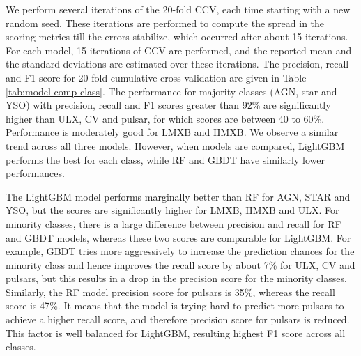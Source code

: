 \documentclass[fleqn,usenatbib]{mnras}
\begin{document}
    We perform several iterations of the 20-fold CCV, each time starting with a new random seed. These iterations are performed to compute the spread in the scoring metrics till the errors stabilize, which occurred after about 15 iterations. For each model, 15 iterations of CCV are performed, and the reported  mean and the standard deviations are estimated over these iterations.
    The precision, recall and F1 score for 20-fold cumulative cross validation are given in Table \ref{tab:model-comp-class}. The performance for majority classes (AGN, star and YSO) with precision, recall and F1 scores greater than 92\% are significantly higher than ULX, CV and pulsar, for which scores are between 40 to 60\%. Performance is moderately good for LMXB and HMXB. We observe a similar trend across all three models. However, when models are compared, LightGBM performs the best for each class, while RF and GBDT have similarly lower performances.  
    
   The LightGBM model performs marginally better than RF for AGN, STAR and YSO, but the scores are significantly higher for LMXB, HMXB and ULX. For minority classes, there is a large difference between precision and recall for RF and GBDT models, whereas these two scores are comparable for LightGBM. For example, GBDT tries more aggressively to increase the prediction chances for the minority class and hence improves the recall score by about 7\% for ULX, CV and pulsars, but this results in a drop in the precision score for the minority classes.
   Similarly, the RF model precision score for pulsars is 35\%, whereas the recall score is 47\%. It means that the model is trying hard to predict more pulsars to achieve a higher recall score, and therefore precision score for pulsars is reduced. This factor is well balanced for LightGBM, resulting highest F1 score across all classes.
\end{document}
